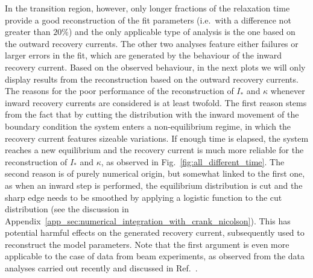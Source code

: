 In the transition region, however, only longer fractions of the relaxation time provide a good reconstruction of the fit parameters  {(i.e.\ with a difference not greater than $20\%$)} and the only applicable type of analysis is the one based on the outward recovery currents. The other two analyses feature either failures or larger errors in the fit, {which are generated by the behaviour of the inward recovery current}. Based on the observed behaviour, in the next plots we will only display results from the reconstruction based on the outward recovery currents. {The reasons for the poor performance of the reconstruction of $I_\ast$ and $\kappa$ whenever inward recovery currents are considered is at least twofold. The first reason stems from the fact that by cutting the distribution with the inward movement of the boundary condition the system enters a non-equilibrium regime, in which the recovery current features sizeable variations. If enough time is elapsed, the system reaches a new equilibrium and the recovery current is much more reliable for the reconstruction of $I_\ast$ and $\kappa$, as observed in Fig.~\ref{fig:all_different_time}. The second reason is of purely numerical origin, but somewhat linked to the first one, as when an inward step is performed, the equilibrium distribution is cut and the sharp edge needs to be smoothed by applying a logistic function to the cut distribution (see the discussion in Appendix~\ref{app_sec:numerical_integration_with_crank_nicolson}). This has potential harmful effects on the generated recovery current, subsequently used to reconstruct the model parameters. Note that the first argument is even more applicable to the case of data from beam experiments, as observed from the data analyses carried out recently and discussed in Ref.~\cite{montanari:ipac22-mopost043}.}

